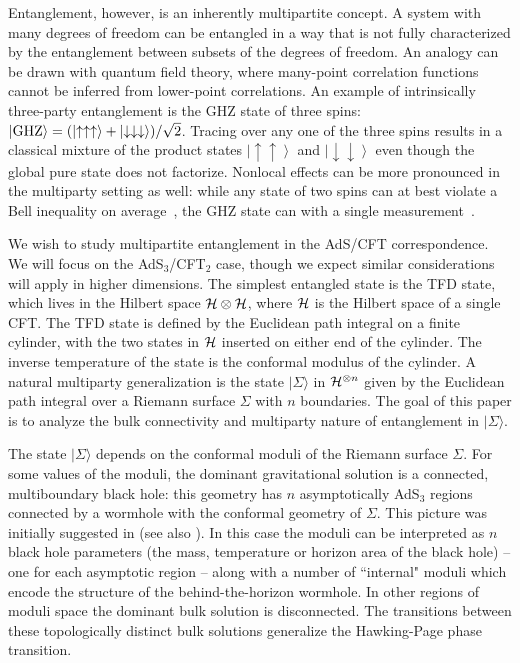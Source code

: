 \documentclass[12pt]{article}
\numberwithin{equation}{section}
\begin{document}
Entanglement, however, is an inherently multipartite concept. A system with many degrees of freedom can be entangled in a way that is not fully characterized by the entanglement between subsets of the degrees of freedom. An analogy can be drawn with quantum field theory, where many-point correlation functions cannot be inferred from lower-point correlations.      An example of intrinsically three-party entanglement is the GHZ state of three spins: $|{\rm GHZ}\rangle = (\left|\uparrow \uparrow \uparrow \right\rangle + \left|\downarrow \downarrow \downarrow \right\rangle ) / \sqrt{2}$. Tracing over any one of the three spins results in a classical mixture of the product states $\left|\uparrow \uparrow \right\rangle$ and $\left|\downarrow \downarrow\right\rangle$ even though the global pure state does not factorize. Nonlocal effects can be more pronounced in the multiparty setting as well: while any state of two spins can at best violate a Bell inequality on average~\cite{cirel1980quantum}, the GHZ state can with a single measurement~\cite{greenberger1990bell}.


We wish to study multipartite entanglement in the AdS/CFT correspondence.  We will focus on the AdS${}_3$/CFT${}_2$ case, though we expect similar considerations will apply in higher dimensions. The simplest entangled state is the TFD state, which lives in the Hilbert space ${\cal H}\otimes {\cal H}$, where ${\cal H}$ is the Hilbert space of a single CFT. The TFD state is defined by the Euclidean path integral on a finite cylinder, with the two states in ${\cal H}$ inserted on either end of the cylinder.  The inverse temperature of the state is the conformal modulus of the cylinder. A natural multiparty generalization is the state $|\Sigma \rangle$ in ${\cal H}^{\otimes n}$ given by the Euclidean path integral over a Riemann surface $\Sigma$ with $n$  boundaries.
The goal of this paper is to analyze the bulk connectivity and multiparty nature of entanglement in $|\Sigma \rangle$.

The state $|\Sigma\rangle$ depends on the conformal moduli of the Riemann surface $\Sigma$. For some values of the moduli, the dominant gravitational solution is a connected, multiboundary black hole: this geometry  has $n$ asymptotically AdS$_3$ regions connected  by a wormhole with the conformal geometry of $\Sigma$. This picture was initially suggested in \cite{Maldacena:2001kr} (see also \cite{Krasnov:2000zq, Krasnov:2003ye, Skenderis:2009ju}). In this case the moduli can be interpreted as $n$ black hole parameters (the mass, temperature or horizon area of the black hole) -- one for each asymptotic region -- along with a number of ``internal" moduli which encode the structure of the behind-the-horizon wormhole. In other regions of moduli space the dominant bulk solution is disconnected.  The transitions between these topologically distinct bulk solutions generalize the Hawking-Page phase transition.
\end{document}
